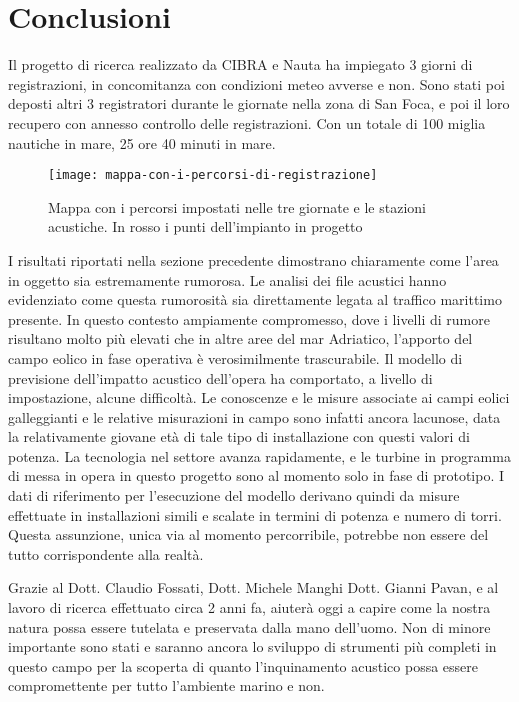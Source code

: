 
\chapter{Conclusioni}
Il progetto di ricerca realizzato da CIBRA e Nauta ha impiegato 3 giorni di registrazioni, in concomitanza con condizioni meteo avverse e non. 
Sono stati poi deposti altri 3 registratori durante le giornate nella zona di San Foca, e poi il loro recupero con annesso controllo delle registrazioni.
Con un totale di 100 miglia nautiche in mare, 25 ore 40 minuti in mare. 

\begin{figure}[h]
\centering
\texttt{[image: mappa-con-i-percorsi-di-registrazione]}
\caption{Mappa con i percorsi impostati nelle tre giornate e le stazioni acustiche. In rosso i punti dell’impianto in progetto}
\end{figure}

I risultati riportati nella sezione precedente dimostrano chiaramente come l’area in oggetto sia estremamente rumorosa.
Le analisi dei file acustici hanno evidenziato come questa rumorosità sia direttamente legata al traffico marittimo presente. 
In questo contesto ampiamente compromesso, dove i livelli di rumore risultano molto più elevati che in altre aree del mar Adriatico, l’apporto del campo eolico in fase operativa è verosimilmente trascurabile. 
Il modello di previsione dell’impatto acustico dell’opera ha comportato, a livello di impostazione, alcune difficoltà. 
Le conoscenze e le misure associate ai campi eolici galleggianti e le relative misurazioni in campo sono infatti ancora lacunose, data la relativamente giovane età di tale tipo di installazione con questi valori di potenza. 
La tecnologia nel settore avanza rapidamente, e le turbine in programma di messa in opera in questo progetto sono al momento solo in fase di prototipo. 
I dati di riferimento per l’esecuzione del modello derivano quindi da misure effettuate in installazioni simili e scalate in termini di potenza e numero di torri. 
Questa assunzione, unica via al momento percorribile, potrebbe non essere del tutto corrispondente alla realtà. 

Grazie al Dott. Claudio Fossati, Dott. Michele Manghi Dott. Gianni Pavan, e al lavoro di ricerca effettuato circa 2 anni fa, aiuterà oggi a capire come la nostra natura possa essere tutelata e preservata dalla mano dell'uomo. 
Non di minore importante sono stati e saranno ancora lo sviluppo di strumenti più completi in questo campo per la scoperta di quanto l'inquinamento acustico possa essere compromettente per tutto l'ambiente marino e non. 

